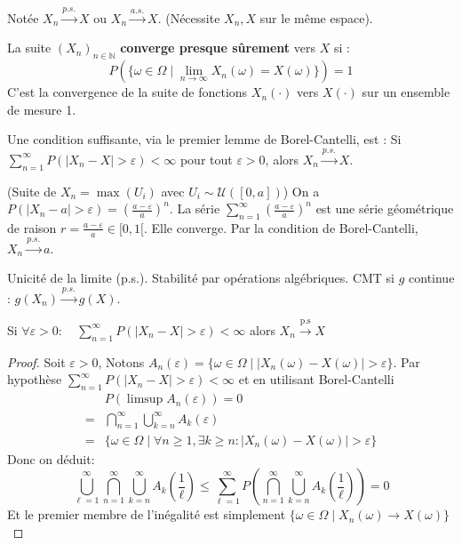 Notée $X_n \xrightarrow{p.s.} X$ ou $X_n \xrightarrow{a.s.} X$. (Nécessite $X_n, X$ sur le même espace).

\begin{definition}
La suite $(X_n)_{n \in \mathbb{N}}$ \textbf{converge presque sûrement} vers $X$ si :
$$P(\{\omega \in \Omega \mid \lim_{n \to \infty} X_n(\omega) = X(\omega)\}) = 1$$
C'est la convergence de la suite de fonctions $X_n(\cdot)$ vers $X(\cdot)$ sur un ensemble de mesure 1.
\end{definition}

Une condition suffisante, via le premier lemme de Borel-Cantelli, est : Si $\sum_{n=1}^{\infty} P(|X_n - X| > \varepsilon) < \infty$ pour tout $\varepsilon > 0$, alors $X_n \xrightarrow{p.s.} X$.

\begin{exemple}(Suite de $X_n = \max(U_i)$ avec $U_i \sim \mathcal{U}([0, a])$)
On a $P(|X_n - a| > \varepsilon) = \left(\frac{a-\varepsilon}{a}\right)^n$. La série $\sum_{n=1}^{\infty} \left(\frac{a-\varepsilon}{a}\right)^n$ est une série géométrique de raison $r = \frac{a-\varepsilon}{a} \in [0, 1[$. Elle converge. Par la condition de Borel-Cantelli, $X_n \xrightarrow{p.s.} a$.
\end{exemple}

\begin{proposition}
Unicité de la limite (p.s.). Stabilité par opérations algébriques. CMT si $g$ continue : $g(X_n) \xrightarrow{p.s.} g(X)$.
\end{proposition}

\begin{proposition}
    Si $\forall \varepsilon>0 : \quad \sum_{n=1}^\infty P(|X_n-X|> \varepsilon)< \infty$ alors $X_n \overset{\text{p.s}}{\to}X$
\end{proposition}

\begin{proof}
    Soit $\varepsilon>0$, Notons $A_n(\varepsilon)=\{\omega\in \Omega\mid |X_n(\omega)-X(\omega)|>\varepsilon\}$. Par hypothèse $\sum_{n=1}^\infty P(|X_n-X|> \varepsilon)< \infty$ et en utilisant Borel-Cantelli 
    \begin{align*}
        &P(\limsup A_n(\varepsilon))=0\\
        =&\bigcap_{n=1}^\infty\bigcup_{k=n}^\infty A_k(\varepsilon)\\
        =&\{\omega\in \Omega \mid \forall n\geq 1, \exists k\ge n: |X_n(\omega)-X(\omega)|>\varepsilon\}
    \end{align*}
    Donc on déduit:
    \[
    \bigcup_{\ell=1}^\infty\bigcap_{n=1}^\infty\bigcup_{k=n}^\infty A_k\left(\frac{1}{\ell}\right)\leq \sum_{\ell=1}^\infty P\left(\bigcap_{n=1}^\infty\bigcup_{k=n}^\infty A_k(\frac{1}{\ell})\right)=0
    \]
    Et le premier membre de l'inégalité est simplement $\{\omega\in \Omega\mid X_n(\omega)\to X(\omega)\}$
\end{proof}

